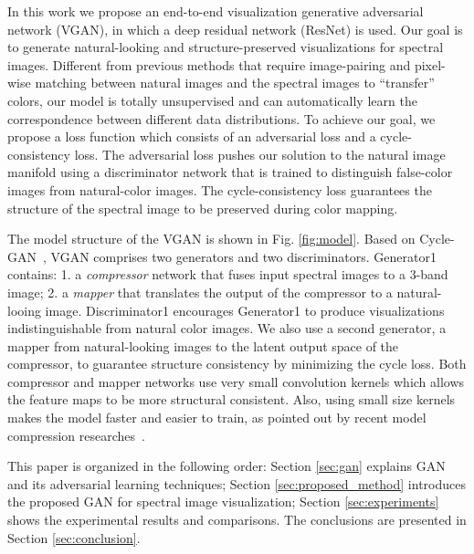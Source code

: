 \documentclass[10pt,conference,a4paper]{IEEEtran}
\begin{document}
In this work we propose an end-to-end visualization generative adversarial network (VGAN), in which a deep residual network (ResNet) is used.
Our goal is to generate natural-looking and structure-preserved visualizations for spectral images.
Different from previous methods that require image-pairing and pixel-wise matching between natural images and the spectral images to ``transfer''  colors, our model is totally unsupervised and can automatically learn the correspondence between different data distributions.
To achieve our goal, we propose a loss function which consists of an adversarial loss and a cycle-consistency loss.
The adversarial loss pushes our solution to the natural image manifold using a discriminator network
that is trained to distinguish false-color images from natural-color images.
The cycle-consistency loss guarantees the structure of the spectral image to be preserved during color mapping.

The model structure of the VGAN is shown in Fig. \ref{fig:model}.
Based on Cycle-GAN~\cite{cyclegan}, VGAN comprises two generators and two discriminators.
Generator1 contains: 1. a \textit{compressor} network that fuses input spectral images to a 3-band image; 2. a \textit{mapper} that translates the output of the compressor to a natural-looing image.
Discriminator1 encourages Generator1 to produce visualizations indistinguishable from natural color images.
We also use a second generator, a mapper from natural-looking images to the latent output space of the compressor, to guarantee structure consistency by minimizing the cycle loss.
Both compressor and mapper networks use very small convolution kernels which allows the feature maps to be more structural consistent. Also, using small size kernels makes the model faster and easier to train, as pointed out by recent model compression researches~\cite{squeezenet2016,mobilenet2017}.


This paper is organized in the following order: Section \ref{sec:gan} explains GAN and its adversarial learning techniques; Section \ref{sec:proposed_method} introduces the proposed GAN for spectral image visualization; Section \ref{sec:experiments} shows the experimental results and comparisons. The conclusions are presented in Section \ref{sec:conclusion}.
\end{document}
